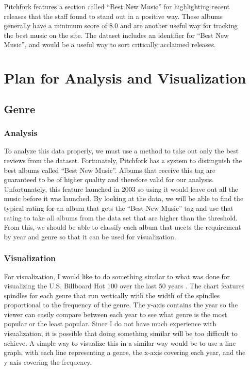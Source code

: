 \documentclass{article}
\begin{document}
Pitchfork features a section called ``Best New Music'' for highlighting
recent releases that the staff found to stand out in a positive way.
These albums generally have a minimum score of 8.0 and are another
useful way for tracking the best music on the site. The dataset includes
an identifier for ``Best New Music'', and would be a useful way to sort
critically acclaimed releases.

\section{Plan for Analysis and
Visualization}\label{plan-for-analysis-and-visualization}

\subsection{Genre}\label{genre}

\subsubsection{Analysis}\label{analysis}

To analyze this data properly, we must use a method to take out only the
best reviews from the dataset. Fortunately, Pitchfork has a system to
distinguish the best albums called ``Best New Music''. Albums that
receive this tag are guaranteed to be of higher quality and therefore
valid for our analysis. Unfortunately, this feature launched in 2003 so
using it would leave out all the music before it was launched. By
looking at the data, we will be able to find the typical rating for an
album that gets the ``Best New Music'' tag and use that rating to take
all albums from the data set that are higher than the threshold. From
this, we should be able to classify each album that meets the
requirement by year and genre so that it can be used for visualization.

\subsubsection{Visualization}\label{visualization}

For visualization, I would like to do something similar to what was done
for visualizing the U.S. Billboard Hot 100 over the last 50 years
\citep{BillboardFigure}. The chart features spindles for each genre that
run vertically with the width of the spindles proportional to the
frequency of the genre. The y-axis contains the year so the viewer can
easily compare between each year to see what genre is the most popular
or the least popular. Since I do not have much experience with
visualization, it is possible that doing something similar will be too
difficult to achieve. A simple way to visualize this in a similar way
would be to use a line graph, with each line representing a genre, the
x-axis covering each year, and the y-axis covering the frequency.
\end{document}
